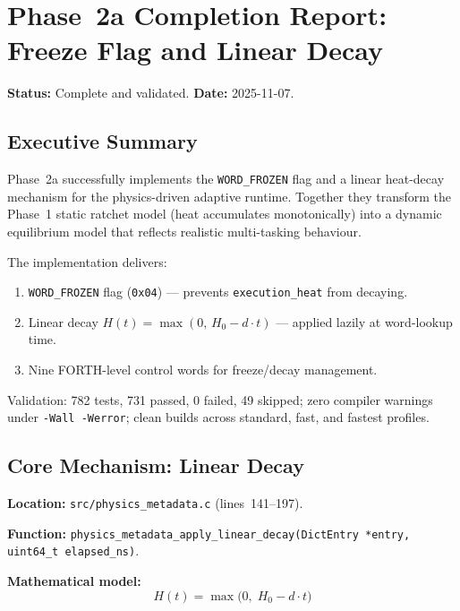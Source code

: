 
\section{Phase~2a Completion Report: Freeze Flag and Linear Decay}
\label{sec:phase2a-completion}

\textbf{Status:} Complete and validated.
\textbf{Date:} 2025-11-07.

\subsection{Executive Summary}

Phase~2a successfully implements the \texttt{WORD\_FROZEN} flag and a
linear heat-decay mechanism for the physics-driven adaptive runtime.
Together they transform the Phase~1 static ratchet model (heat accumulates
monotonically) into a dynamic equilibrium model that reflects realistic
multi-tasking behaviour.

The implementation delivers:
\begin{enumerate}
  \item \texttt{WORD\_FROZEN} flag (\texttt{0x04}) — prevents
    \texttt{execution\_heat} from decaying.
  \item Linear decay $H(t) = \max(0,\, H_0 - d \cdot t)$ — applied lazily
    at word-lookup time.
  \item Nine FORTH-level control words for freeze/decay management.
\end{enumerate}

Validation: 782 tests, 731 passed, 0 failed, 49 skipped; zero compiler
warnings under \texttt{-Wall -Werror}; clean builds across standard, fast,
and fastest profiles.

\subsection{Core Mechanism: Linear Decay}

\textbf{Location:} \texttt{src/physics\_metadata.c} (lines~141--197).

\textbf{Function:} \texttt{physics\_metadata\_apply\_linear\_decay(DictEntry *entry, uint64\_t elapsed\_ns)}.

\textbf{Mathematical model:}
\[
  H(t) = \max\!\bigl(0,\; H_0 - d \cdot t\bigr)
\]


